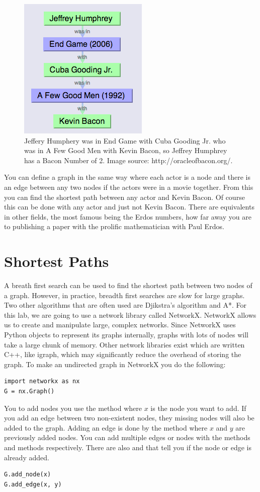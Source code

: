 \begin{figure}[h]
\includegraphics[scale = .6]{Example}
\caption{Jeffery Humphery was in End Game with Cuba Gooding Jr. who was in A Few Good Men with Kevin Bacon, so Jeffrey Humphrey has a Bacon Number of 2.  Image source: http://oracleofbacon.org/.}
\end{figure}

You can define a graph in the same way where each actor is a node and there is an edge between any two nodes if the actors were in a movie together. From this you can find the shortest path between any actor and Kevin Bacon. Of course this can be done with any actor and just not Kevin Bacon. There are equivalents in other fields, the most famous being the Erdos numbers, how far away you are to publishing a paper with the prolific mathematician with Paul Erdos.

\section*{Shortest Paths}
A breath first search can be used to find the shortest path between two nodes of a graph.  However, in practice, breadth first searches are slow for large graphs. Two other algorithms that are often used are Djikstra's algorithm and A*. For this lab, we are going to use a network library called NetworkX. NetworkX allows us to create and manipulate large, complex networks.  Since NetworkX uses Python objects to represent its graphs internally, graphs with lots of nodes will take a large chunk of memory.  Other network libraries exist which are written C++, like igraph, which may significantly reduce the overhead of storing the graph.
To make an undirected graph in NetworkX you do the following:
\begin{lstlisting}
import networkx as nx
G = nx.Graph()
\end{lstlisting}
You to add nodes you use the  method where $x$ is the node you want to add.  If you add an edge between two non-existent nodes, they missing nodes will also be added to the graph. Adding an edge is done by the  method where $x$ and $y$ are previously added nodes. You can add multiple edges or nodes with the methods  and  methods respectively.  There are also  and  that tell you if the node or edge is already added.
\begin{lstlisting}
G.add_node(x)
G.add_edge(x, y)
\end{lstlisting}

